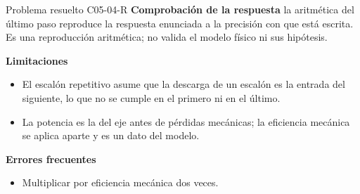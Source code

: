 \documentclass[10pt,openany]{book}
\begin{document}
\begin{studiumworked}{Problema resuelto C05-04-R}
\noindent\textbf{Comprobación de la respuesta} la aritmética del último paso reproduce la respuesta enunciada a la precisión con que está escrita. Es una reproducción aritmética; no valida el modelo físico ni sus hipótesis.

\noindent\textbf{Limitaciones}
\begin{itemize}
\item El escalón repetitivo asume que la descarga de un escalón es la entrada del siguiente, lo que no se cumple en el primero ni en el último.
\item La potencia es la del eje antes de pérdidas mecánicas; la eficiencia mecánica se aplica aparte y es un dato del modelo.
\end{itemize}

\noindent\textbf{Errores frecuentes}
\begin{itemize}
\item Multiplicar por eficiencia mecánica dos veces.
\end{itemize}
\end{studiumworked}
\end{document}
